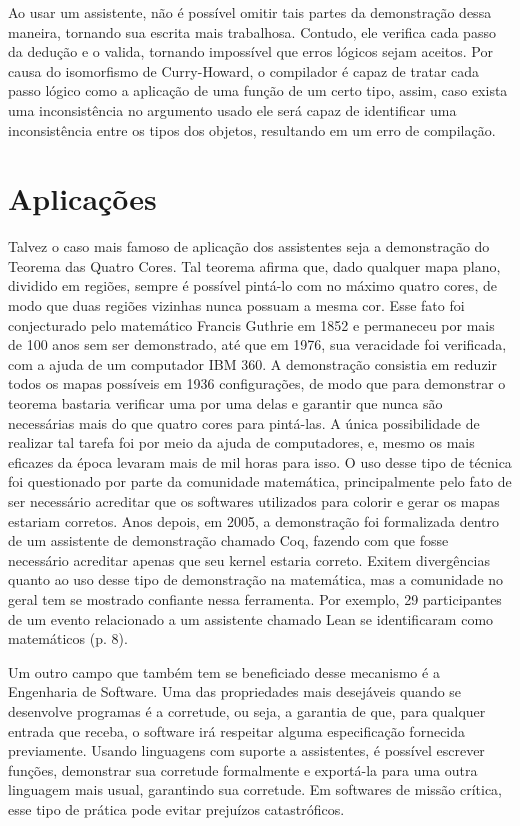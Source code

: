 \documentclass[12pt, oneside, a4paper,english,brazil]{abntex2}
\begin{document}
\qquad Ao usar um assistente, não é possível omitir tais partes da demonstração dessa
maneira, tornando sua escrita mais trabalhosa. Contudo, ele verifica cada passo da dedução
e o valida, tornando impossível que erros lógicos sejam aceitos. Por causa do isomorfismo
de Curry-Howard, o compilador é capaz de tratar cada passo lógico como a aplicação de
uma função de um certo tipo, assim, caso exista uma inconsistência no argumento usado
ele será capaz de identificar uma inconsistência entre os tipos dos objetos, resultando em
um erro de compilação.

\section{Aplica\c{c}\~oes}

\qquad Talvez o caso mais famoso de aplicação dos assistentes seja a demonstração do
Teorema das Quatro Cores. Tal teorema afirma que, dado qualquer mapa plano, dividido
em regiões, sempre é possível pintá-lo com no máximo quatro cores, de modo que duas
regiões vizinhas nunca possuam a mesma cor. Esse fato foi conjecturado pelo matemático
Francis Guthrie em 1852 e permaneceu por mais de 100 anos sem ser demonstrado, até
que em 1976, sua veracidade foi verificada, com a ajuda de um computador IBM 360. A
demonstração consistia em reduzir todos os mapas possíveis em 1936 configurações, de
modo que para demonstrar o teorema bastaria verificar uma por uma delas e garantir que
nunca são necessárias mais do que quatro cores para pintá-las. A única possibilidade de
realizar tal tarefa foi por meio da ajuda de computadores, e, mesmo os mais eficazes da
época levaram mais de mil horas para isso. O uso desse tipo de técnica foi questionado por
parte da comunidade matemática, principalmente pelo fato de ser necessário acreditar que
os softwares utilizados para colorir e gerar os mapas estariam corretos. Anos depois, em
2005, a demonstração foi formalizada dentro de um assistente de demonstra\c{c}\~ao chamado Coq, fazendo com
que fosse necessário acreditar apenas que seu kernel estaria correto. Exitem divergências
quanto ao uso desse tipo de demonstração na matemática, mas a comunidade no geral
tem se mostrado confiante nessa ferramenta. Por exemplo, 29 participantes de um evento
relacionado a um assistente chamado Lean se identificaram como matemáticos\cite{hitchhiker} (p. 8).

\qquad Um outro campo que também tem se beneficiado desse mecanismo é a Engenharia
de Software. Uma das propriedades mais desejáveis quando se desenvolve programas é a
corretude, ou seja, a garantia de que, para qualquer entrada que receba, o software irá
respeitar alguma especificação fornecida previamente. Usando linguagens com suporte a
assistentes, é possível escrever funções, demonstrar sua corretude formalmente e exportá-la
para uma outra linguagem mais usual, garantindo sua corretude. Em softwares de miss\~ao cr\'itica,
esse tipo de prática pode evitar prejuízos catastróficos.
\end{document}
